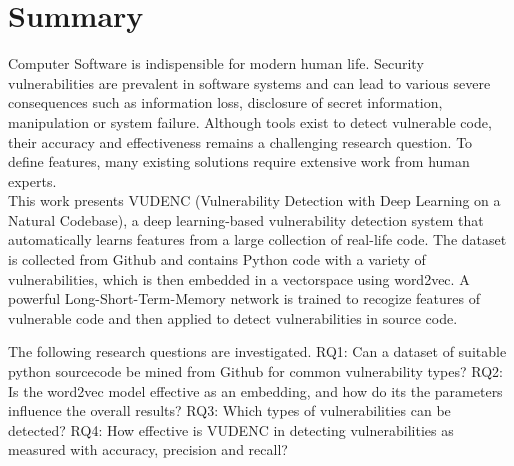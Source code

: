 \documentclass[
	a4paper,
	pagesize,
	pdftex,
	12pt,
	twoside, %
	BCOR=5mm, %
	ngerman,
	fleqn,
	final,
	]{scrartcl}
\begin{document}

\mitverteidigung %
\makeTitel
\tableofcontents
\newpage

\section{Summary}
Computer Software is indispensible for modern human life. Security vulnerabilities are prevalent in software systems and can lead to various severe consequences such as information loss, disclosure of secret information, manipulation or system failure. Although tools exist to detect vulnerable code, their accuracy and effectiveness remains a challenging research question. To define features, many existing solutions require extensive work from human experts.\\
This work presents VUDENC (Vulnerability Detection with Deep Learning on a Natural Codebase), a deep learning-based vulnerability detection system that automatically learns features from a large collection of real-life code. The dataset is collected from Github and contains Python code with a variety of vulnerabilities, which is then embedded in a vectorspace using word2vec. A powerful Long-Short-Term-Memory network is trained to recogize features of vulnerable code and then applied to detect vulnerabilities in source code. 

The following research questions are investigated. RQ1: Can a dataset of suitable python sourcecode be mined from Github for common vulnerability types? RQ2: Is the word2vec model effective as an embedding, and how do its the parameters influence the overall results? RQ3: Which types of vulnerabilities can be detected? RQ4: How effective is VUDENC in detecting vulnerabilities as measured with accuracy, precision and recall? 
\end{document}
